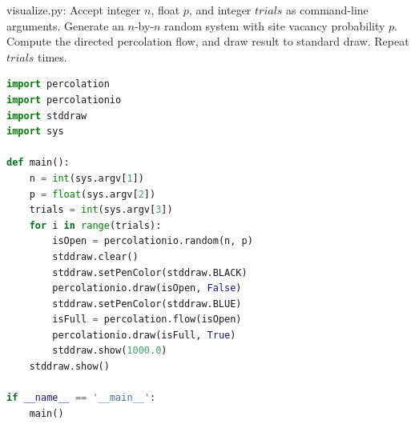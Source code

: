 \documentclass[8pt,a4paper,compress]{beamer}
\begin{document}
\begin{frame}[fragile]
\pause

\begin{framed}
\tiny visualize.py: Accept integer $n$, float $p$, and integer $trials$ as command-line arguments. Generate an $n$-by-$n$ random system with site vacancy probability $p$. Compute the directed percolation flow, and draw result to standard draw. Repeat $trials$ times.
\end{framed}

\begin{lstlisting}[language=Python,style=focusin]
import percolation
import percolationio
import stddraw
import sys

def main():
    n = int(sys.argv[1])
    p = float(sys.argv[2])
    trials = int(sys.argv[3])
    for i in range(trials):
        isOpen = percolationio.random(n, p)
        stddraw.clear()
        stddraw.setPenColor(stddraw.BLACK)
        percolationio.draw(isOpen, False)
        stddraw.setPenColor(stddraw.BLUE)
        isFull = percolation.flow(isOpen)
        percolationio.draw(isFull, True)
        stddraw.show(1000.0)
    stddraw.show()

if __name__ == '__main__':
    main()
\end{lstlisting}
\end{frame}
\end{document}
